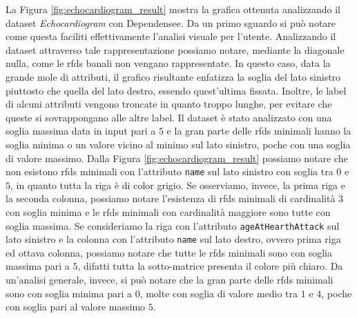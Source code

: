 La Figura \ref{fig:echocardiogram_result} mostra la grafica ottenuta analizzando il dataset \textit{Echocardiogram} con Dependensee. Da un primo sguardo si pu\`{o} notare come questa faciliti effettivamente l'analisi visuale per l'utente. Analizzando il dataset attraverso tale rappresentazione possiamo notare, mediante la diagonale nulla, come le \acrlong{rfds} banali non vengano rappresentate. In questo caso, data la grande mole di attributi, il grafico risultante enfatizza la soglia del lato sinistro piuttosto che quella del lato destro, essendo quest'ultima fissata. Inoltre, le label di alcuni attributi vengono troncate in quanto troppo lunghe, per evitare che queste si sovrappongano alle altre label. Il dataset \`{e} stato analizzato con una soglia massima data in input pari a $5$ e la gran parte delle \acrlong{rfds} minimali hanno la soglia minima o un valore vicino al minimo sul lato sinistro, poche con una soglia di valore massimo. Dalla Figura \ref{fig:echocardiogram_result} possiamo notare che non esistono \acrlong{rfds} minimali con l'attributo \texttt{name} sul lato sinistro con soglia tra $0$ e $5$, in quanto tutta la riga \`{e} di color grigio. Se osserviamo, invece, la prima riga e la seconda colonna, possiamo notare l'esistenza di \acrlong{rfds} minimali di cardinalit\`{a} $3$ con soglia minima e le \acrlong{rfds} minimali con cardinalit\`{a} maggiore sono tutte con soglia massima. Se consideriamo la riga con l'attributo \texttt{ageAtHearthAttack} sul lato sinistro e la colonna con l'attributo \texttt{name} sul lato destro, ovvero prima riga ed ottava colonna, possiamo notare che tutte le \acrlong{rfds} minimali sono con soglia massima pari a $5$, difatti tutta la sotto-matrice presenta il colore pi\`{u} chiaro. Da un'analisi generale, invece, si pu\`{o} notare che la gran parte delle \acrlong{rfds} minimali sono con soglia minima pari a $0$, molte con soglia di valore medio tra $1$ e $4$, poche con soglia pari al valore massimo $5$.\par
